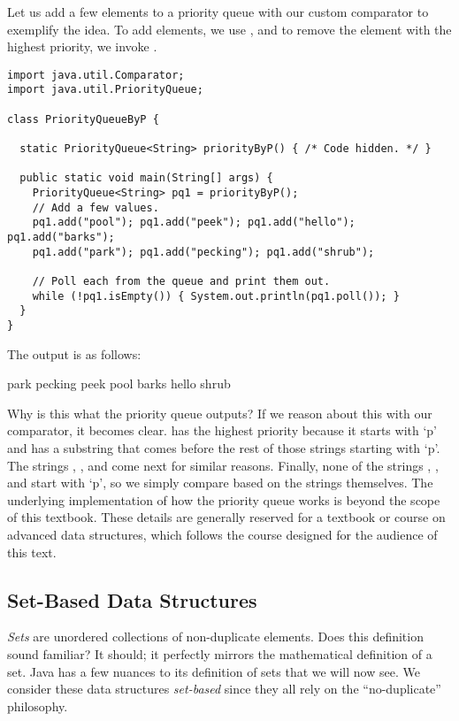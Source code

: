 Let us add a few elements to a priority queue with our custom comparator to exemplify the idea. To add elements, we use , and to remove the element with the highest priority, we invoke .

\begin{lstlisting}[language=MyJava]
import java.util.Comparator;
import java.util.PriorityQueue;

class PriorityQueueByP {

  static PriorityQueue<String> priorityByP() { /* Code hidden. */ }

  public static void main(String[] args) {
    PriorityQueue<String> pq1 = priorityByP();
    // Add a few values.
    pq1.add("pool"); pq1.add("peek"); pq1.add("hello"); pq1.add("barks");
    pq1.add("park"); pq1.add("pecking"); pq1.add("shrub");

    // Poll each from the queue and print them out.
    while (!pq1.isEmpty()) { System.out.println(pq1.poll()); }
  }
}
\end{lstlisting}
The output is as follows:
\begin{verbnobox}[\small]
park
pecking
peek
pool
barks
hello
shrub
\end{verbnobox}
Why is this what the priority queue outputs? If we reason about this with our comparator, it becomes clear.  has the highest priority because it starts with `p' and has a substring that comes before the rest of those strings starting with `p'. The strings , , and  come next for similar reasons. Finally, none of the strings , , and  start with `p', so we simply compare based on the strings themselves. The underlying implementation of how the priority queue works is beyond the scope of this textbook. These details are generally reserved for a textbook or course on advanced data structures, which follows the course designed for the audience of this text.

\subsection{Set-Based Data Structures}
\emph{Sets} are unordered collections of non-duplicate elements. Does this definition sound familiar? It should; it perfectly mirrors the mathematical definition of a set. Java has a few nuances to its definition of sets that we will now see. We consider these data structures \emph{set-based} since they all rely on the ``no-duplicate'' philosophy.

